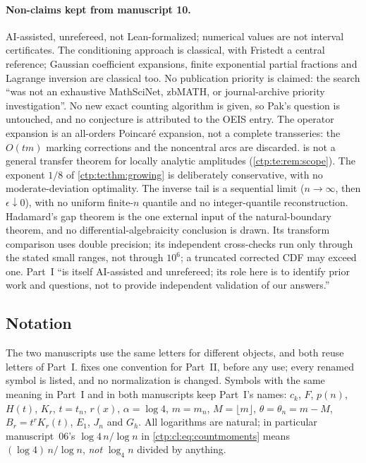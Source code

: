 \documentclass[11pt,a4paper]{article}
\numberwithin{equation}{section}
\theoremstyle{definition}
\theoremstyle{remark}
\begin{document}
\paragraph{Non-claims kept from manuscript 10.} AI-assisted, unrefereed,
not Lean-formalized; numerical values are not interval certificates. The
conditioning approach is classical, with Fristedt \cite{fristedt} a
central reference; Gaussian coefficient expansions, finite exponential
partial fractions and Lagrange inversion are classical too. No publication
priority is claimed: the search ``was not an exhaustive MathSciNet,
zbMATH, or journal-archive priority investigation''. No new exact counting
algorithm is given, so Pak's question \cite[\S2.5]{pak} is untouched, and
no conjecture is attributed to the OEIS entry. The operator expansion is
an all-orders Poincar\'e expansion, not a complete transseries: the
$O(tm)$ marking corrections and the noncentral arcs are discarded.
 is not a general transfer theorem for locally
analytic amplitudes (\cref{ctp:te:rem:scope}). The exponent $1/8$ of
\cref{ctp:te:thm:growing} is deliberately conservative, with no
moderate-deviation optimality. The inverse tail is a sequential limit
($n\to\infty$, then $\epsilon\downarrow0$), with no uniform finite-$n$
quantile and no integer-quantile reconstruction. Hadamard's gap theorem is
the one external input of the natural-boundary theorem, and no
differential-algebraicity conclusion is drawn. Its transform comparison
uses double precision; its independent cross-checks run only through the
stated small ranges, not through $10^6$; a truncated corrected CDF may
exceed one. Part~I ``is itself AI-assisted and unrefereed; its role here is
to identify prior work and questions, not to provide independent validation
of our answers.''

\subsection{Notation}
\label{ctp:cl:sec:notation}

The two manuscripts use the same letters for different objects, and both
reuse letters of Part~I.  fixes one convention
for Part~II, before any use; every renamed symbol is listed, and no
normalization is changed. Symbols with the same meaning in Part~I and in
both manuscripts keep Part~I's names: $c_k$, $F$, $p(n)$, $H(t)$, $K_r$,
$t=t_n$, $r(x)$, $\alpha=\log4$, $m=m_n$, $M=\lfloor m\rfloor$,
$\theta=\theta_n=m-M$, $B_r=t^rK_r(t)$, $E_1$, $J_n$ and $G_h$. All
logarithms are natural; in particular manuscript~06's
$\log4\,n/\log n$ in \eqref{ctp:cl:eq:countmoments} means
$(\log4)\,n/\log n$, \emph{not} $\log_4n$ divided by anything.
\end{document}

